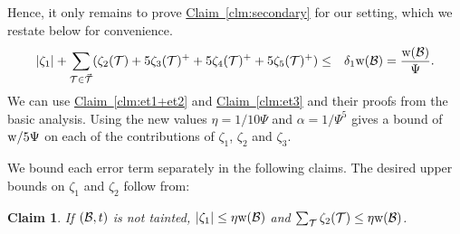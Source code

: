\documentclass{acmsmall}
\newtheorem{claim}[theorem]{Claim}
\newcommand{\cB}{{\cal B}}
\newcommand{\cT}{{\cal T}}
\newcommand{\Thm}[1]{\hyperref[thm:#1]{Thm.\,\ref*{thm:#1}}} %
\newcommand{\Clm}[1]{\hyperref[clm:#1]{Claim~\ref*{clm:#1}}} %
\newcommand{\taint}{\eta}
\newcommand{\width}{{\bf {\rm  w}}}
\newcommand{\gridprec}{\alpha}
\newcommand{\errorcont}{\Psi}
\newcommand{\errorterm}{\zeta}
\begin{document}
Hence, it only remains to prove  \Clm{secondary} for our setting, which we restate below
for convenience.
%
%
\begin{eqnarray}
\nonumber
|\errorterm_1|+\sum_{\cT \in \vec{\cT}} (\errorterm_2(\cT) + 5 \errorterm_3(\cT)^+ + 5\errorterm_4(\cT)^+ +5 \errorterm_5(\cT)^+)& \leq & \delta_1\width(\cB)
= \frac{\width(\cB)}{\errorcont}.
\end{eqnarray}
%
%
%
We can use \Clm{et1+et2} and \Clm{et3} and their proofs from the basic analysis.
Using the new values $\taint=1/10\errorcont$ and $\gridprec=1/\errorcont^5$ gives a bound of $\width/5\errorcont$
on each of the contributions of $\errorterm_1$, $\errorterm_2$ and $\errorterm_3$.


 \iffalse
We bound each error term separately in the following claims.
%
The desired upper bounds on $\errorterm_1$ and $\errorterm_2$ follow from:
\begin{claim}
\label{claim:et1+et2}
If  $(\cB,t)$ is not tainted, $|\errorterm_1| \leq \taint\width(\cB)$ and $\sum_\cT \errorterm_2(\cT) \leq \taint \width(\cB)$.
\end{claim}
\end{document}
